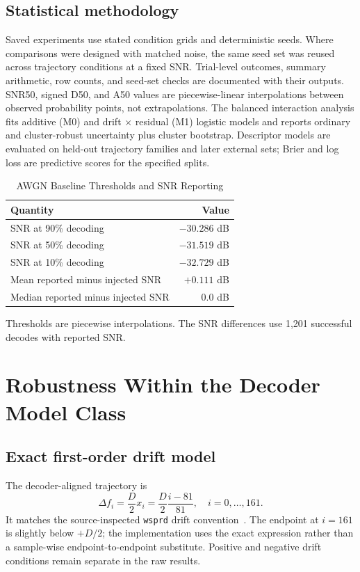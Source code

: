 \documentclass{ieeeaccess}
\begin{document}
\subsection{Statistical methodology}
Saved experiments use stated condition grids and deterministic seeds. Where comparisons were designed with matched noise, the same seed set was reused across trajectory conditions at a fixed SNR. Trial-level outcomes, summary arithmetic, row counts, and seed-set checks are documented with their outputs. SNR50, signed D50, and A50 values are piecewise-linear interpolations between observed probability points, not extrapolations. The balanced interaction analysis fits additive (M0) and drift $\times$ residual (M1) logistic models and reports ordinary and cluster-robust uncertainty plus cluster bootstrap. Descriptor models are evaluated on held-out trajectory families and later external sets; Brier and log loss are predictive scores for the specified splits.

\begin{table}[t]
\caption{AWGN Baseline Thresholds and SNR Reporting}
\label{tab:awgn}
\centering\footnotesize
\begin{tabular}{lr}
\toprule
Quantity & Value \\
\midrule
SNR at 90\% decoding & $-30.286$ dB \\
SNR at 50\% decoding & $-31.519$ dB \\
SNR at 10\% decoding & $-32.729$ dB \\
Mean reported minus injected SNR & $+0.111$ dB \\
Median reported minus injected SNR & $0.0$ dB \\
\bottomrule
\end{tabular}
\vspace{2pt}
\parbox{\columnwidth}{\footnotesize Thresholds are piecewise interpolations. The SNR differences use 1,201 successful decodes with reported SNR.}
\end{table}

\section{Robustness Within the Decoder Model Class}
\subsection{Exact first-order drift model}
The decoder-aligned trajectory is
\begin{equation}
\Delta f_i=\frac{D}{2}x_i=\frac{D}{2}\frac{i-81}{81},\quad i=0,\ldots,161.
\label{eq:linear}
\end{equation}
It matches the source-inspected \texttt{wsprd} drift convention~\cite{wsjtx302}. The endpoint at $i=161$ is slightly below $+D/2$; the implementation uses the exact expression rather than a sample-wise endpoint-to-endpoint substitute. Positive and negative drift conditions remain separate in the raw results.
\end{document}

